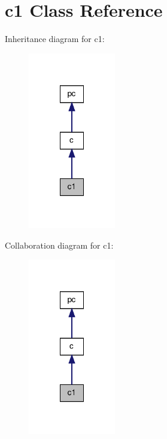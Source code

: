 \hypertarget{classc1}{\section{c1 Class Reference}
\label{classc1}
}


Inheritance diagram for c1\-:\nopagebreak
\begin{figure}[H]
\begin{center}
\leavevmode
\includegraphics[width=108pt]{classc1__inherit__graph}
\end{center}
\end{figure}


Collaboration diagram for c1\-:\nopagebreak
\begin{figure}[H]
\begin{center}
\leavevmode
\includegraphics[width=108pt]{classc1__coll__graph}
\end{center}
\end{figure}
